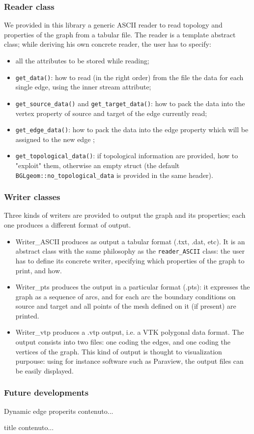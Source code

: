 \documentclass[11pt]{beamer}
\begin{document}
	\begin{frame}
		\frametitle{Reader class}
			We provided in this library a generic ASCII reader to read topology and properties of the graph from a tabular file. The reader is a template abstract class; while deriving his own concrete reader, the user has to specify:
			\begin{itemize}
				\item all the attributes to be stored while reading;
				\item \texttt{get\_data()}: how to read (in the right order) from the file the data for each single edge, using the inner stream attribute;
				\item \texttt{get\_source\_data()} and \texttt{get\_target\_data()}: how to pack the data into the vertex property of source and target of the edge currently read;
				\item \texttt{get\_edge\_data()}: how to pack the data into the edge property which will be assigned to the new edge ;
				\item \texttt{get\_topological\_data()}: if topological information are provided, how to "exploit" them, otherwise an empty struct (the default \texttt{BGLgeom::no\_topological\_data} is provided in the same header).
			\end{itemize}
	\end{frame}

	\begin{frame}
		\frametitle{Writer classes}
		Three kinds of writers are provided to output the graph and its properties; each one produces a different format of output.
		\begin{itemize}
			\item{Writer\_ASCII} produces as output a tabular format (.txt, .dat, etc). It is an abstract class with the same philosophy as the \texttt{reader\_ASCII} class: the user has to define its concrete writer, specifying which properties of the graph to print, and how.
			\item{Writer\_pts} produces the output in a particular format (.pts): it expresses the graph as a sequence of arcs, and for each arc the boundary conditions on source and target and all points of the mesh defined on it (if present) are printed. 
			\item{Writer\_vtp} produces a .vtp output, i.e. a VTK polygonal data format. The output consists into two files: one coding the edges, and one coding the vertices of the graph. This kind of output is thought to visualization purpouse: using for instance software such as Paraview, the output files can be easily displayed.
		\end{itemize}
	
	\begin{frame}
		\frametitle{Future developments}
		\begin{block}{Dynamic edge properits}
			contenuto...
		\end{block}
		\begin{block}{title}
			contenuto...
		\end{block}
	\end{frame}

	\end{frame}	
\end{document}
